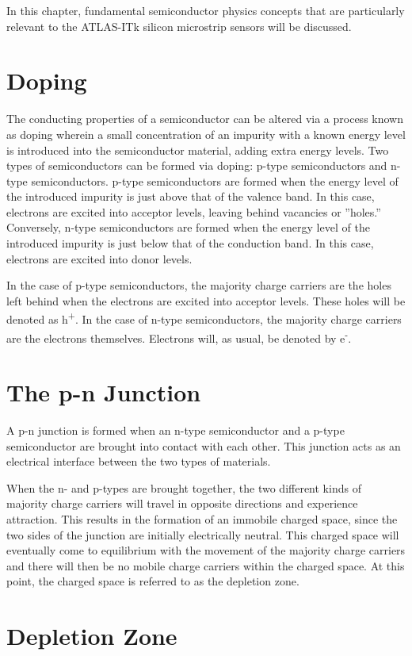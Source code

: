 \documentclass[letterpaper, 11pt]{report}
\begin{document}
In this chapter, fundamental semiconductor physics concepts that are particularly relevant to the ATLAS-ITk silicon microstrip sensors will be discussed.

\section{Doping}

The conducting properties of a semiconductor can be altered via a process known as doping wherein a small concentration of an impurity with a known energy level is introduced into the semiconductor material, adding extra energy levels.  Two types of semiconductors can be formed via doping: p-type semiconductors and n-type semiconductors.  p-type semiconductors are formed when the energy level of the introduced impurity is just above that of the valence band.  In this case, electrons are excited into acceptor levels, leaving behind vacancies or ''holes.''   Conversely, n-type semiconductors are formed when the energy level of the introduced impurity is just below that of the conduction band.  In this case, electrons are excited into donor levels. 

In the case of p-type semiconductors, the majority charge carriers are the holes left behind when the electrons are excited into acceptor levels. These holes will be denoted as h\textsuperscript{+}.   In the case of n-type semiconductors, the majority charge carriers are the electrons themselves.  Electrons will, as usual, be denoted by e\textsuperscript{-}.
\section{The p-n Junction}

A p-n junction is formed when an n-type semiconductor and a p-type semiconductor are brought into contact with each other.  This junction acts as an electrical interface between the two types of materials.

When the n- and p-types are brought together, the two different kinds of majority charge carriers will travel in opposite directions and experience attraction.  This results in the formation of an immobile charged space, since the two sides of the junction are initially electrically neutral.  This charged space will eventually come to equilibrium with the movement of the majority charge carriers and there will then be no mobile charge carriers within the charged space.  At this point, the charged space is referred to as the depletion zone.
\section{Depletion Zone}
\end{document}
